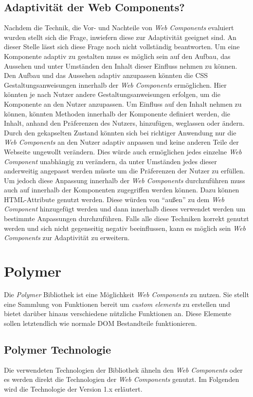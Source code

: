 \documentclass[12pt, paper=a4, bibtotoc, toc=listof, headsepline=true]{scrreprt}
\begin{document}
	\section{Adaptivität der Web Components?}
	Nachdem die Technik, die Vor- und Nachteile von \emph{Web Components} evaluiert wurden stellt sich die Frage, inwiefern diese zur Adaptivität geeignet sind. An dieser Stelle lässt sich diese Frage noch nicht vollständig beantworten. Um eine Komponente adaptiv zu gestalten muss es möglich sein auf den Aufbau, das Aussehen und unter Umständen den Inhalt dieser Einfluss nehmen zu können.
	\newline
	Den Aufbau und das Aussehen adaptiv anzupassen könnten die \ac{CSS} Gestaltungsanweisungen innerhalb der \emph{Web Components} ermöglichen. Hier könnten je nach Nutzer andere Gestaltungsanweisungen erfolgen, um die Komponente an den Nutzer anzupassen. Um Einfluss auf den Inhalt nehmen zu können, könnten Methoden innerhalb der Komponente definiert werden, die Inhalt, anhand den Präferenzen des Nutzers, hinzufügen, weglassen oder ändern. Durch den gekapselten Zustand könnten sich bei richtiger Anwendung nur die \emph{Web Components} an den Nutzer adaptiv anpassen und keine anderen Teile der Webseite ungewollt verändern. Dies würde auch ermöglichen jedes einzelne \emph{Web Component} unabhängig zu verändern, da unter Umständen jedes dieser anderweitig angepasst werden müsste um die Präferenzen der Nutzer zu erfüllen. Um jedoch diese Anpassung innerhalb der \emph{Web Components} durchzuführen muss auch auf innerhalb der Komponenten zugegriffen werden können. Dazu können HTML-Attribute genutzt werden. Diese würden von \enquote{außen} zu dem \emph{Web Component} hinzugefügt werden und dann innerhalb dieses verwendet werden um bestimmte Anpassungen durchzuführen. Falls alle diese Techniken korrekt genutzt werden und sich nicht gegenseitig negativ beeinflussen, kann es möglich sein \emph{Web Components} zur Adaptivität zu erweitern.
\chapter{Polymer}
Die \emph{Polymer} Bibliothek ist eine Möglichkeit \emph{Web Components} zu nutzen. Sie stellt eine Sammlung von Funktionen bereit um \emph{custom elements} zu erstellen und bietet darüber hinaus verschiedene nützliche Funktionen an. Diese Elemente sollen letztendlich wie normale \ac{DOM} Bestandteile funktionieren\cite{polymerFeaOve}.
	\section{Polymer Technologie} Die verwendeten Technologien der Bibliothek ähneln den \emph{Web Components} oder es werden direkt die Technologien der \emph{Web Components} genutzt. Im Folgenden wird die Technologie der Version 1.x erläutert.
\end{document}
